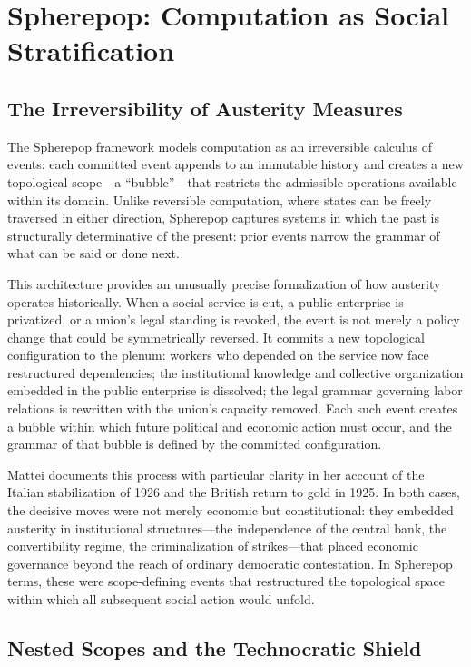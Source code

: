 \documentclass[12pt,a4paper]{article}
\begin{document}
\section{Spherepop: Computation as Social Stratification}

\subsection{The Irreversibility of Austerity Measures}

The Spherepop framework models computation as an irreversible calculus of events: each committed event appends to an immutable history and creates a new topological scope---a ``bubble''---that restricts the admissible operations available within its domain. Unlike reversible computation, where states can be freely traversed in either direction, Spherepop captures systems in which the past is structurally determinative of the present: prior events narrow the grammar of what can be said or done next.

This architecture provides an unusually precise formalization of how austerity operates historically. When a social service is cut, a public enterprise is privatized, or a union's legal standing is revoked, the event is not merely a policy change that could be symmetrically reversed. It commits a new topological configuration to the plenum: workers who depended on the service now face restructured dependencies; the institutional knowledge and collective organization embedded in the public enterprise is dissolved; the legal grammar governing labor relations is rewritten with the union's capacity removed. Each such event creates a bubble within which future political and economic action must occur, and the grammar of that bubble is defined by the committed configuration.

Mattei documents this process with particular clarity in her account of the Italian stabilization of 1926 and the British return to gold in 1925. In both cases, the decisive moves were not merely economic but constitutional: they embedded austerity in institutional structures---the independence of the central bank, the convertibility regime, the criminalization of strikes---that placed economic governance beyond the reach of ordinary democratic contestation. In Spherepop terms, these were scope-defining events that restructured the topological space within which all subsequent social action would unfold.

\subsection{Nested Scopes and the Technocratic Shield}
\end{document}
